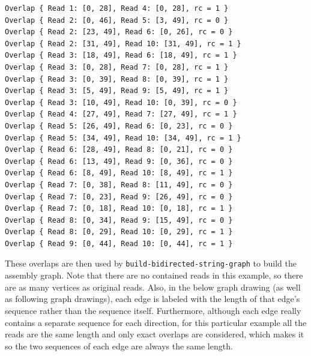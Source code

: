 \documentclass[10pt]{article}
\newcommand{\ProgramName}[1]{{\tt #1}}
\begin{document}
\begin{verbatim}
Overlap { Read 1: [0, 28], Read 4: [0, 28], rc = 1 }
Overlap { Read 2: [0, 46], Read 5: [3, 49], rc = 0 }
Overlap { Read 2: [23, 49], Read 6: [0, 26], rc = 0 }
Overlap { Read 2: [31, 49], Read 10: [31, 49], rc = 1 }
Overlap { Read 3: [18, 49], Read 6: [18, 49], rc = 1 }
Overlap { Read 3: [0, 28], Read 7: [0, 28], rc = 1 }
Overlap { Read 3: [0, 39], Read 8: [0, 39], rc = 1 }
Overlap { Read 3: [5, 49], Read 9: [5, 49], rc = 1 }
Overlap { Read 3: [10, 49], Read 10: [0, 39], rc = 0 }
Overlap { Read 4: [27, 49], Read 7: [27, 49], rc = 1 }
Overlap { Read 5: [26, 49], Read 6: [0, 23], rc = 0 }
Overlap { Read 5: [34, 49], Read 10: [34, 49], rc = 1 }
Overlap { Read 6: [28, 49], Read 8: [0, 21], rc = 0 }
Overlap { Read 6: [13, 49], Read 9: [0, 36], rc = 0 }
Overlap { Read 6: [8, 49], Read 10: [8, 49], rc = 1 }
Overlap { Read 7: [0, 38], Read 8: [11, 49], rc = 0 }
Overlap { Read 7: [0, 23], Read 9: [26, 49], rc = 0 }
Overlap { Read 7: [0, 18], Read 10: [0, 18], rc = 1 }
Overlap { Read 8: [0, 34], Read 9: [15, 49], rc = 0 }
Overlap { Read 8: [0, 29], Read 10: [0, 29], rc = 1 }
Overlap { Read 9: [0, 44], Read 10: [0, 44], rc = 1 }
\end{verbatim}

These overlaps are then used by \ProgramName{build-bidirected-string-graph} to
build the assembly graph.  Note that there are no contained reads in this
example, so there are as many vertices as original reads.  Also, in the below
graph drawing (as well as following graph drawings), each edge is labeled with
the length of that edge's sequence rather than the sequence itself.
Furthermore, although each edge really contains a separate sequence for each
direction, for this particular example all the reads are the same length and
only exact overlaps are considered, which makes it so the two sequences of each
edge are always the same length.
\end{document}
